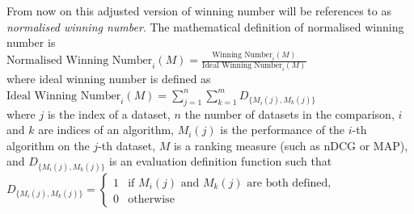 From now on this adjusted version of winning number will be references to as \emph{normalised winning number}. The mathematical definition of normalised winning number is\\

$\text{Normalised Winning Number}_i(M) = \frac{\text{Winning Number}_i(M)}{\text{Ideal Winning Number}_i(M)}$\\

\noindent
where ideal winning number is defined as\\

$\text{Ideal Winning Number}_i(M) = \sum\nolimits_{j=1}^n \sum\nolimits_{k=1}^m D_{\{M_i(j),M_k(j)\}}$\\

where $j$ is the index of a dataset, $n$ the number of datasets in the comparison, $i$ and $k$ are indices of an algorithm, $M_i(j)$ is the performance of the $i$-th algorithm on the $j$-th dataset, $M$ is a ranking measure (such as \ac{nDCG} or \ac{MAP}), and $D_{\{M_i(j),M_k(j)\}}$ is an evaluation definition function such that\\

$D_{\{M_i(j),M_k(j)\}} = \begin{cases}
1 & \text{if } M_i(j) \text{ and } M_k(j) \text{ are both defined}, \\
0 & \text{otherwise}
\end{cases}$\\

